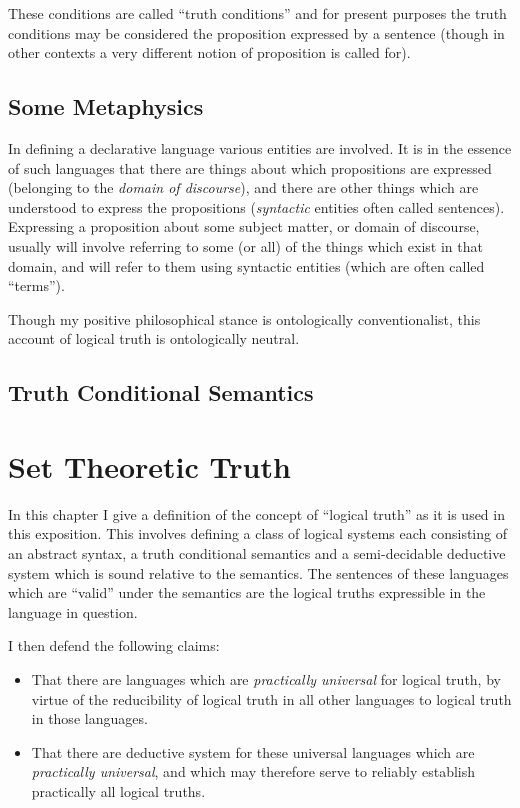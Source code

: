 \documentclass[10pt,titlepage]{book}
\begin{document}
These conditions are called ``truth conditions'' and for present purposes the truth conditions may be considered the proposition expressed by a sentence (though in other contexts a very different notion of proposition is called for).

\subsection{Some Metaphysics}

In defining a declarative language various entities are involved.
It is in the essence of such languages that there are things about which propositions are expressed (belonging to the \emph{domain of discourse}), and there are other things which are understood to express the propositions (\emph{syntactic} entities often called sentences).
Expressing a proposition about some subject matter, or domain of discourse, usually will involve referring to some (or all) of the things which exist in that domain, and will refer to them using syntactic entities (which are often called ``terms'').

Though my positive philosophical stance is ontologically conventionalist, this account of logical truth is ontologically neutral.

\subsection{Truth Conditional Semantics}

\section{Set Theoretic Truth}

In this chapter I give a definition of the concept of ``logical truth'' as it is used in this exposition.
This involves defining a class of logical systems each consisting of an abstract syntax, a truth conditional semantics and a semi-decidable deductive system which is sound relative to the semantics.
The sentences of these languages which are ``valid'' under the semantics are the logical truths expressible in the language in question.

I then defend the following claims:

\begin{itemize}

\item That there are languages which are \emph{practically universal} for logical truth, by virtue of the reducibility of logical truth in all other languages to logical truth in those languages.
\item That there are deductive system for these universal languages which are \emph{practically universal}, and which may therefore serve to reliably establish practically all logical truths.
\end{itemize}
\end{document}
